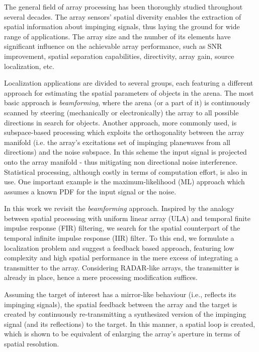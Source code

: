The general field of array processing has been thoroughly studied throughout several decades.
The array sensors' spatial diversity enables the extraction of spatial information about impinging signals, thus laying the ground for wide range of applications.
The array size and the number of its elements have significant influence on the achievable array performance, such as \gls{SNR} improvement, spatial separation capabilities, directivity, array gain, source localization, etc.
\par 
Localization applications are divided to several groups, each featuring a different approach for estimating the spatial parameters of objects in the arena.
The most basic approach is \emph{beamforming}, where the arena (or a part of it) is continuously scanned by steering (mechanically or electronically) the array to all possible directions in search for objects.
Another approach, more commonly used, is subspace-based processing which exploits the orthogonality between the array manifold (i.e. the array's excitations set of impinging planewaves from all directions) and the noise subspace.
In this scheme the input signal is projected onto the array manifold - thus mitigating non directional noise interference. 
Statistical processing, although costly in terms of computation effort, is also in use.
One important example is the maximum-likelihood (ML) approach which assumes a known \gls{PDF} for the input signal or the noise.
\par
In this work we revisit the \emph{beamforming} approach.
Inspired by the analogy between spatial processing with uniform linear array (ULA) and temporal finite impulse response (FIR) filtering, we search for the spatial counterpart of the temporal infinite impulse response (IIR) filter.
To this end, we formulate a localization problem and suggest a feedback based approach, featuring low complexity and high spatial performance in the mere excess of integrating a transmitter to the array.
Considering RADAR-like arrays, the transmitter is already in place, hence a mere processing modification suffices.
\par  
Assuming the target of interest has a mirror-like behaviour (i.e., reflects its impinging signals), the spatial feedback between the array and the target is created by continuously re-transmitting a synthesized version of the impinging signal (and its reflections) to the target.
In this manner, a spatial loop is created, which is shown to be equivalent of enlarging the array's aperture in terms of spatial resolution.
\par 
